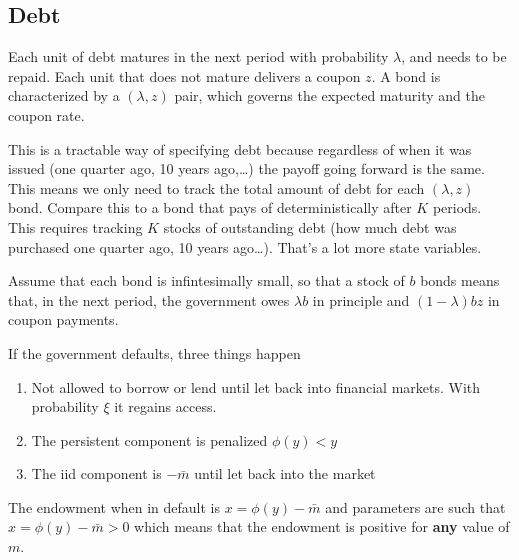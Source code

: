 \documentclass[11pt, pdftex]{article}
\begin{document}
\subsection*{Debt}
Each unit of debt matures in the next period with probability $\lambda$, and needs to be repaid. Each unit that does not mature delivers a coupon $z$. A bond is characterized by a $(\lambda, z)$ pair, which governs the expected maturity and the coupon rate.

This is a tractable way of specifying debt because regardless of when it was issued (one quarter ago, 10 years ago,\ldots) the payoff going forward is the same. This means we only need to track the total amount of debt for each $(\lambda,z)$ bond. Compare this to a bond that pays of deterministically after $K$ periods. This requires tracking $K$ stocks of outstanding debt (how much debt was purchased one quarter ago, 10 years ago\ldots). That's a lot more state variables.

Assume that each bond is infintesimally small, so that a stock of $b$ bonds means that, in the next period, the government owes $\lambda b$ in principle and $(1-\lambda)b z$ in coupon payments.

If the government defaults, three things happen
\begin{enumerate}
  \item Not allowed to borrow or lend until let back into financial markets. With probability $\xi$ it regains access.
  \item The persistent component is penalized $\phi(y)<y$
  \item The iid component is $-\bar{m}$ until let back into the market
\end{enumerate}
The endowment when in default is $x=\phi(y)-\bar{m}$ and parameters are such that $x=\phi(y)-\bar{m}>0$ which means that the endowment is positive for \textbf{any} value of $m$.
\end{document}
